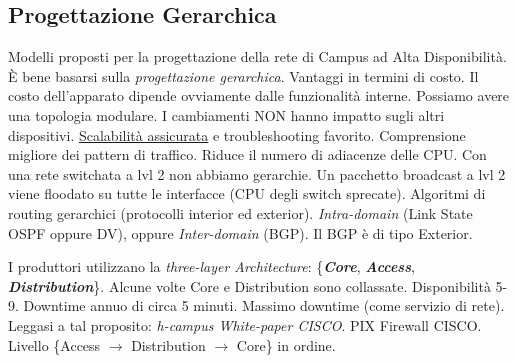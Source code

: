 \begin{itemize}
\end{itemize}

\subsection{Progettazione Gerarchica}

Modelli proposti per la progettazione della rete di Campus ad Alta Disponibilità. \`E bene basarsi sulla \textit{progettazione gerarchica}. Vantaggi in termini di costo. Il costo dell'apparato dipende ovviamente dalle funzionalità interne. Possiamo avere una topologia modulare. I cambiamenti NON hanno impatto sugli altri dispositivi. \underline{Scalabilità assicurata} e troubleshooting favorito. Comprensione migliore dei pattern di traffico. Riduce il numero di adiacenze delle CPU. Con una rete switchata a lvl 2 non abbiamo gerarchie. Un pacchetto broadcast a lvl 2 viene floodato su tutte le interfacce (CPU degli switch sprecate). Algoritmi di routing gerarchici (protocolli interior ed exterior). \textit{Intra-domain} (Link State OSPF oppure DV), oppure \textit{Inter-domain} (BGP). Il BGP è di tipo Exterior.

I produttori utilizzano la \textit{three-layer Architecture}: \{\textit{\textbf{Core}}, \textit{\textbf{Access}}, \textit{\textbf{Distribution}}\}. Alcune volte Core e Distribution sono collassate. Disponibilità 5-9. Downtime annuo di circa 5 minuti. Massimo downtime (come servizio di rete). Leggasi a tal proposito: \textit{h-campus White-paper CISCO}. PIX Firewall CISCO. Livello \{Access $\rightarrow$ Distribution $\rightarrow$ Core\} in ordine. 

